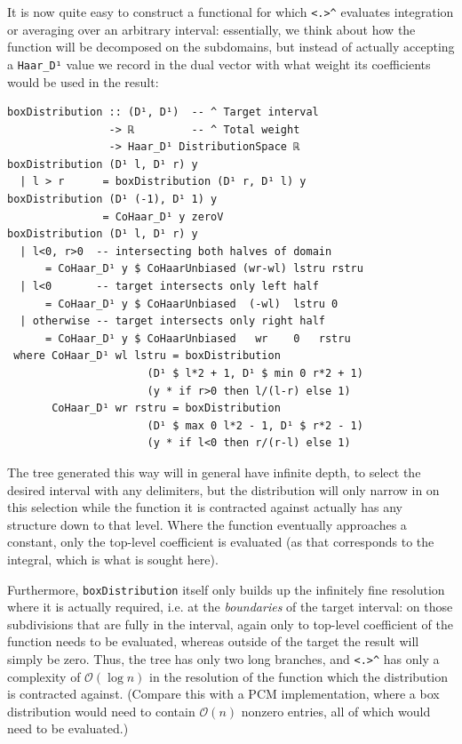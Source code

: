 \documentclass[sigplan,review,anonymous]{acmart}\settopmatter{printfolios=true,printccs=false,printacmref=false}
\begin{document}
It is now quite easy to construct a functional for which \lstinline`<.>^` evaluates integration or averaging over an arbitrary interval: essentially, we think about how the function will be decomposed on the subdomains, but instead of actually accepting a \lstinline`Haar_D¹` value we record in the dual vector with what weight its coefficients would be used in the result:
\begin{lstlisting}
boxDistribution :: (D¹, D¹)  -- ^ Target interval
                -> ℝ         -- ^ Total weight
                -> Haar_D¹ DistributionSpace ℝ
boxDistribution (D¹ l, D¹ r) y
  | l > r      = boxDistribution (D¹ r, D¹ l) y
boxDistribution (D¹ (-1), D¹ 1) y
               = CoHaar_D¹ y zeroV
boxDistribution (D¹ l, D¹ r) y
  | l<0, r>0  -- intersecting both halves of domain
      = CoHaar_D¹ y $ CoHaarUnbiased (wr-wl) lstru rstru
  | l<0       -- target intersects only left half
      = CoHaar_D¹ y $ CoHaarUnbiased  (-wl)  lstru 0
  | otherwise -- target intersects only right half
      = CoHaar_D¹ y $ CoHaarUnbiased   wr    0   rstru
 where CoHaar_D¹ wl lstru = boxDistribution
                      (D¹ $ l*2 + 1, D¹ $ min 0 r*2 + 1)
                      (y * if r>0 then l/(l-r) else 1)
       CoHaar_D¹ wr rstru = boxDistribution
                      (D¹ $ max 0 l*2 - 1, D¹ $ r*2 - 1)
                      (y * if l<0 then r/(r-l) else 1)
\end{lstlisting}
The tree generated this way will in general have infinite depth, to select the desired interval with any delimiters, but the distribution will only narrow in on this selection while the function it is contracted against actually has any structure down to that level. Where the function eventually approaches a constant, only the top-level coefficient is evaluated (as that corresponds to the integral, which is what is sought here).

Furthermore, \lstinline`boxDistribution` itself only builds up the infinitely fine resolution where it is actually required, i.e. at the \emph{boundaries} of the target interval: on those subdivisions that are fully in the interval, again only to top-level coefficient of the function needs to be evaluated, whereas outside of the target the result will simply be zero.
Thus, the tree has only two long branches, and \lstinline`<.>^` has only a complexity of $\mathcal{O}(\log n)$ in the resolution of the function which the distribution is contracted against. (Compare this with a PCM implementation, where a box distribution would need to contain $\mathcal{O}(n)$ nonzero entries, all of which would need to be evaluated.)
\end{document}
